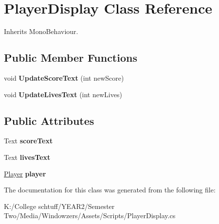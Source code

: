 \hypertarget{class_player_display}{}\section{Player\+Display Class Reference}
\label{class_player_display}


Inherits Mono\+Behaviour.

\subsection*{Public Member Functions}
\begin{DoxyCompactItemize}
\item 
\mbox{\label{class_player_display_aebcde60f327f6fa88cb3bb6b7666fca7}} 
void {\bfseries Update\+Score\+Text} (int new\+Score)
\item 
\mbox{\label{class_player_display_a27a7b710536e4cfcecc7a03bc4554601}} 
void {\bfseries Update\+Lives\+Text} (int new\+Lives)
\end{DoxyCompactItemize}
\subsection*{Public Attributes}
\begin{DoxyCompactItemize}
\item 
\mbox{\label{class_player_display_ab9cc36180ecf9eed5ed03fd1c0253514}} 
Text {\bfseries score\+Text}
\item 
\mbox{\label{class_player_display_a03ad89a3e11d422b22651bc5d3513b32}} 
Text {\bfseries lives\+Text}
\item 
\mbox{\label{class_player_display_a3c1cb23865c1b18319f808d6fa8a55dc}} 
\hyperlink{class_player}{Player} {\bfseries player}
\end{DoxyCompactItemize}


The documentation for this class was generated from the following file\+:\begin{DoxyCompactItemize}
\item 
K\+:/\+College schtuff/\+Y\+E\+A\+R2/\+Semester Two/\+Media/\+Windowzers/\+Assets/\+Scripts/Player\+Display.\+cs\end{DoxyCompactItemize}
